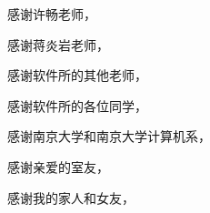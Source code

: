 \begin{acknowledgement}

感谢许畅老师，

感谢蒋炎岩老师，

感谢软件所的其他老师，

感谢软件所的各位同学，

感谢南京大学和南京大学计算机系，

感谢亲爱的室友，

感谢我的家人和女友，

\end{acknowledgement}